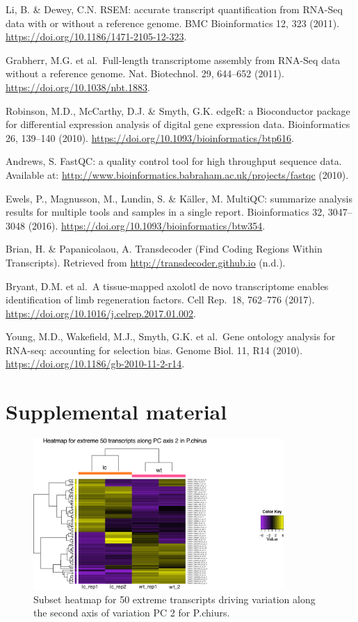 \documentclass[12pt,]{article}
\begin{document}
Li, B. \& Dewey, C.N. RSEM: accurate transcript quantification from
RNA-Seq data with or without a reference genome. BMC Bioinformatics 12,
323 (2011). \url{https://doi.org/10.1186/1471-2105-12-323}.

Grabherr, M.G. et al.~Full-length transcriptome assembly from RNA-Seq
data without a reference genome. Nat. Biotechnol. 29, 644--652 (2011).
\url{https://doi.org/10.1038/nbt.1883}.

Robinson, M.D., McCarthy, D.J. \& Smyth, G.K. edgeR: a Bioconductor
package for differential expression analysis of digital gene expression
data. Bioinformatics 26, 139--140 (2010).
\url{https://doi.org/10.1093/bioinformatics/btp616}.

Andrews, S. FastQC: a quality control tool for high throughput sequence
data. Available at:
\url{http://www.bioinformatics.babraham.ac.uk/projects/fastqc} (2010).

Ewels, P., Magnusson, M., Lundin, S. \& Käller, M. MultiQC: summarize
analysis results for multiple tools and samples in a single report.
Bioinformatics 32, 3047--3048 (2016).
\url{https://doi.org/10.1093/bioinformatics/btw354}.

Brian, H. \& Papanicolaou, A. Transdecoder (Find Coding Regions Within
Transcripts). Retrieved from \url{http://transdecoder.github.io} (n.d.).

Bryant, D.M. et al.~A tissue-mapped axolotl de novo transcriptome
enables identification of limb regeneration factors. Cell Rep.~18,
762--776 (2017). \url{https://doi.org/10.1016/j.celrep.2017.01.002}.

Young, M.D., Wakefield, M.J., Smyth, G.K. et al.~Gene ontology analysis
for RNA-seq: accounting for selection bias. Genome Biol. 11, R14 (2010).
\url{https://doi.org/10.1186/gb-2010-11-2-r14}.

\section{Supplemental material}\label{supplemental-material}

\begin{figure}[htbp]
\centering
\includegraphics[width=0.85\textwidth]{output/figures/pc_and_xm_TMM_EXPR.minRow10.log2.centered.prcomp.extreme50.PC2.components.png}
\caption{Subset heatmap for 50 extreme transcripts driving variation along the second axis of variation PC 2 for P.chiurs.}
\end{figure}





\newpage
\singlespacing 

\end{document}
